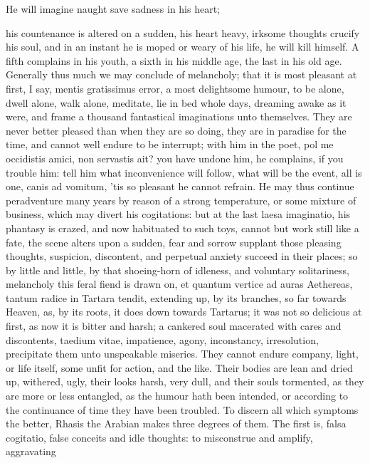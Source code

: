 {He will imagine naught save sadness in his heart;

his countenance is altered on a sudden, his heart heavy, irksome
thoughts crucify his soul, and in an instant he is moped or weary of
his life, he will kill himself. A fifth complains in his youth, a sixth
in his middle age, the last in his old age.
Generally thus much we may conclude of melancholy; that it is
most pleasant at first, I say, mentis gratissimus error, a
most delightsome humour, to be alone, dwell alone, walk alone,
meditate, lie in bed whole days, dreaming awake as it were, and frame a
thousand fantastical imaginations unto themselves. They are never
better pleased than when they are so doing, they are in paradise for
the time, and cannot well endure to be interrupt; with him in the poet,
pol me occidistis amici, non servastis ait? you have undone him,
he complains, if you trouble him: tell him what inconvenience will
follow, what will be the event, all is one, canis ad vomitum,
'tis so pleasant he cannot refrain. He may thus continue
peradventure many years by reason of a strong temperature, or some
mixture of business, which may divert his cogitations: but at the last
laesa imaginatio, his phantasy is crazed, and now habituated to such
toys, cannot but work still like a fate, the scene alters upon a
sudden, fear and sorrow supplant those pleasing thoughts, suspicion,
discontent, and perpetual anxiety succeed in their places; so by little
and little, by that shoeing-horn of idleness, and voluntary
solitariness, melancholy this feral fiend is drawn on, et quantum
vertice ad auras Aethereas, tantum radice in Tartara tendit, extending
up, by its branches, so far towards Heaven, as, by its roots, it does
down towards Tartarus; it was not so delicious at first, as now it is
bitter and harsh; a cankered soul macerated with cares and discontents,
taedium vitae, impatience, agony, inconstancy, irresolution,
precipitate them unto unspeakable miseries. They cannot endure company,
light, or life itself, some unfit for action, and the like. Their
bodies are lean and dried up, withered, ugly, their looks harsh, very
dull, and their souls tormented, as they are more or less entangled, as
the humour hath been intended, or according to the continuance of time
they have been troubled.
To discern all which symptoms the better, Rhasis the Arabian
makes three degrees of them. The first is, falsa cogitatio, false
conceits and idle thoughts: to misconstrue and amplify, aggravating
}
